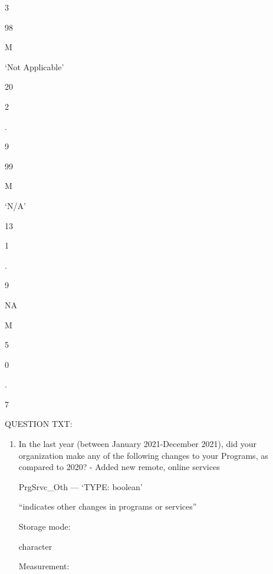 \documentclass[
  letterpaper,
]{scrbook}
\providecommand{\tightlist}{%
  \setlength{\itemsep}{0pt}\setlength{\parskip}{0pt}}\usepackage{longtable,booktabs,array}
\begin{document}
\begin{enumerate}
\begin{enumerate}
\begin{enumerate}
\begin{enumerate}
\begin{enumerate}
\begin{enumerate}
\begin{enumerate}
\begin{enumerate}
\begin{enumerate}
\begin{enumerate}
\begin{enumerate}
\begin{enumerate}
                        3

                        98

                        M

                        `Not Applicable'

                        20

                        2

                        .

                        9

                        99

                        M

                        `N/A'

                        13

                        1

                        .

                        9

                        NA

                        M

                        5

                        0

                        .

                        7

                        QUESTION TXT:

                        \begin{enumerate}
                        \def\labelenumxiii{\arabic{enumxiii}.}
                        \tightlist
                        \item
                          In the last year (between January
                          2021-December 2021), did your organization
                          make any of the following changes to your
                          Programs, as compared to 2020? - Added new
                          remote, online services

                          PrgSrvc\_Oth --- {`TYPE: boolean'}

                          ``indicates other changes in programs or
                          services''

                          Storage mode:

                          character

                          Measurement:


\end{enumerate}
\end{enumerate}
\end{enumerate}
\end{enumerate}
\end{enumerate}
\end{enumerate}
\end{enumerate}
\end{enumerate}
\end{enumerate}
\end{enumerate}
\end{enumerate}
\end{enumerate}
\end{enumerate}
\end{document}
